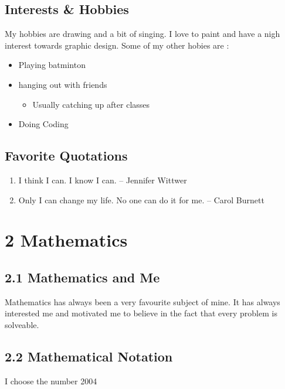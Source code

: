 \documentclass[12pt]{article}
\begin{document}
\subsection*{Interests \& Hobbies}
My hobbies are drawing and a bit of singing. I love to paint and have a nigh interest towards graphic design. Some of my other hobies are :

\begin{itemize}
    \item Playing batminton
    \item hanging out with friends
        \begin{itemize}
            \item Usually catching up after classes
        \end{itemize}
    \item Doing Coding
\end{itemize}

\subsection*{Favorite Quotations}
\begin{enumerate}
    \item I think I can. I know I can. – Jennifer Wittwer
    \item Only I can change my life. No one can do it for me. – Carol Burnett
\end{enumerate}


\section*{2 Mathematics}

\subsection*{2.1 Mathematics and Me}
Mathematics has always been a very favourite subject of mine. It has always interested me and motivated me to believe in the fact that every problem is solveable.

\subsection*{2.2 Mathematical Notation}
I choose the number 2004 
\end{document}
